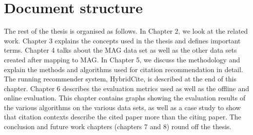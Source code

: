 \section{Document structure}\label{sec:documentstructure}
The rest of the thesis is organised as follows. In Chapter 2, we look at the related work. Chapter 3 explains the concepts used in the thesis and defines important terms. Chapter 4 talks about the MAG data set as well as the other data sets created after mapping to MAG. In Chapter 5, we discuss the methodology and explain the methods and algorithms used for citation recommendation in detail. The running recommender system, HybridCite, is described at the end of this chapter.
Chapter 6 describes the evaluation metrics used as well as the offline and online evaluation. This chapter contains graphs showing the evaluation results of the various algorithms on the various data sets, as well as a case study to show that citation contexts describe the cited paper more than the citing paper.
The conclusion and future work chapters (chapters 7 and 8) round off the thesis.